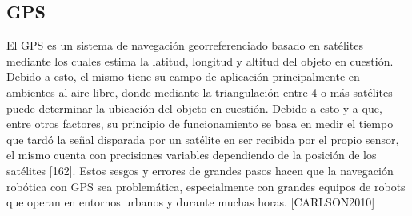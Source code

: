 \subsection{GPS}
El GPS es un sistema de navegación georreferenciado basado en satélites mediante los cuales estima la latitud, longitud y altitud del objeto en cuestión. Debido a esto, el mismo tiene su campo de aplicación principalmente en ambientes al aire libre, donde mediante la triangulación entre 4 o más satélites puede determinar la ubicación del objeto en cuestión. Debido a esto y a que, entre otros factores, su principio de funcionamiento se basa en medir el tiempo que tardó la señal disparada por un satélite en ser recibida por el propio sensor, el mismo cuenta con precisiones variables dependiendo de la posición de los satélites [162]. Estos sesgos y errores de grandes pasos hacen que la navegación robótica con GPS sea problemática, especialmente con grandes equipos de robots que operan en entornos urbanos y durante muchas horas. [CARLSON2010]